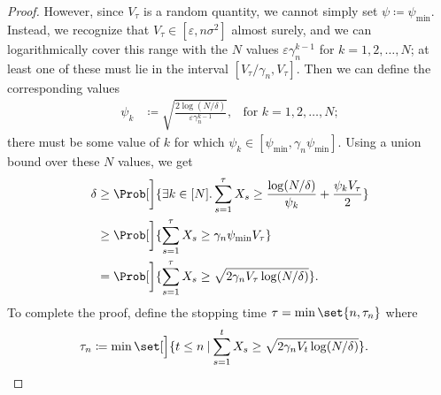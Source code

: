 \documentclass{article}
\newcommand{\defeq}{\coloneq}
\newcommand\given[1][\delimsize]{%
  \providecommand{\delimsize}{}
  \nonscript\:#1\vert\allowbreak\nonscript\:\mathopen{}
}
\begin{document}
\begin{lemma}
\begin{proof}
    However, since $V_\tau$ is a random quantity, we cannot simply set
    $\psi \defeq \psi_{\min}$.  Instead, we recognize that
    $V_\tau \in [\varepsilon, n\sigma^2]$ almost surely, and we can
    logarithmically cover this range with the $N$ values
    $\varepsilon\gamma_n^{k-1}$ for $k=1,2,\dotsc,N$; at least one of
    these must lie in the interval $[V_\tau/\gamma_n, V_\tau]$.  Then
    we can define the corresponding values
    \begin{align*}
      \psi_k &\defeq \sqrt{\frac{2\log(N/\delta)}{\varepsilon\gamma_n^{k-1}}},
              &\text{for } k=1,2,\dotsc,N;
    \end{align*}
    there must be some value of $k$ for which
    $\psi_k \in [\psi_{\min}, \gamma_n\psi_{\min}]$.  Using a union bound
    over these $N$ values, we get
    \begin{align*}
      \delta
      &\ge \Prob[\bigg]{\exists k\in[N]. \sum_{s=1}^\tau X_s \ge \frac{\log(N/\delta)}{\psi_k} + \frac{\psi_k V_\tau}{2}} \\
      &\ge \Prob[\bigg]{\sum_{s=1}^\tau X_s \ge \gamma_n\psi_{\min}V_\tau} \\
      &= \Prob[\bigg]{\sum_{s=1}^\tau X_s \ge \sqrt{2\gamma_nV_\tau\log(N/\delta)}}.
    \end{align*}
    To complete the proof, define the stopping time $\tau =
    \min\set{n,\tau_n}$ where
    \begin{align*}
      \tau_n &\defeq \min\set[\Big]{t \le n \given \sum_{s=1}^tX_s \ge \sqrt{2\gamma_nV_t\log(N/\delta)}}.
              \qedhere
    \end{align*}
  \end{proof}
\end{lemma}
\end{document}
